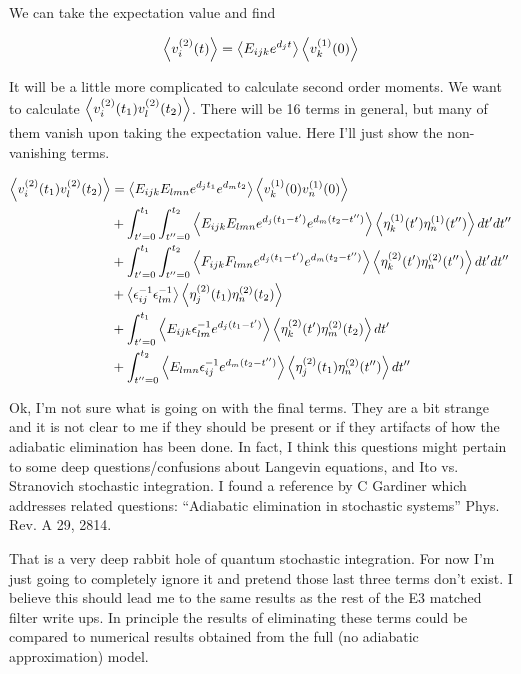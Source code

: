 \documentclass[12pt]{article}
\begin{document}
We can take the expectation value and find

\begin{align}
\Braket{v^{(2)}_{i}(t)} = \Braket{E_{ijk}e^{d_jt}}\Braket{v^{(1)}_{k}(0)}
\end{align}

It will be a little more complicated to calculate second order moments. We want to calculate $\Braket{v^{(2)}_{i}(t_1)v^{(2)}_{l}(t_2)}$. There will be 16 terms in general, but many of them vanish upon taking the expectation value. Here I'll just show the non-vanishing terms.

\begin{align}
\Braket{v^{(2)}_{i}(t_1)v^{(2)}_{l}(t_2)} &= \Braket{E_{ijk}E_{lmn}e^{d_j t_1}e^{d_m t_2}}\Braket{v^{(1)}_{k}(0)v^{(1)}_{n}(0)}\\
&+ \int_{t'=0}^{t_1} \int_{t''=0}^{t_2} \Braket{E_{ijk}E_{lmn}e^{d_j(t_1-t')}e^{d_m(t_2-t'')}}\Braket{\eta^{(1)}_{k}(t')\eta^{(1)}_{n}(t'')}dt'dt''\\
&+ \int_{t'=0}^{t_1} \int_{t''=0}^{t_2} \Braket{F_{ijk}F_{lmn}e^{d_j(t_1-t')}e^{d_m(t_2-t'')}}\Braket{\eta^{(2)}_{k}(t')\eta^{(2)}_{n}(t'')}dt'dt''\\
&+ \Braket{\epsilon^{-1}_{ij} \epsilon^{-1}_{lm}}\Braket{\eta^{(2)}_{j}(t_1)\eta^{(2)}_{n}(t_2)}\\
&+ \int_{t'=0}^{t_1} \Braket{E_{ijk}\epsilon^{-1}_{lm} e^{d_j (t_1-t')}}\Braket{\eta^{(2)}_{k}(t')\eta^{(2)}_{m}(t_2)}dt'\\
&+ \int_{t''=0}^{t_2} \Braket{E_{lmn}\epsilon^{-1}_{ij}e^{d_m (t_2-t'')}}\Braket{\eta^{(2)}_{j}(t_1)\eta^{(2)}_{n}(t'')}dt''
\end{align}

Ok, I'm not sure what is going on with the final terms. They are a bit strange and it is not clear to me if they should be present or if they artifacts of how the adiabatic elimination has been done. In fact, I think this questions might pertain to some deep questions/confusions about Langevin equations, and Ito vs. Stranovich stochastic integration. I found a reference by C Gardiner which addresses related questions: ``Adiabatic elimination in stochastic systems'' Phys. Rev. A 29, 2814.

That is a very deep rabbit hole of quantum stochastic integration. For now I'm just going to completely ignore it and pretend those last three terms don't exist. I believe this should lead me to the same results as the rest of the E3 matched filter write ups. In principle the results of eliminating these terms could be compared to numerical results obtained from the full (no adiabatic approximation) model.
\end{document}
